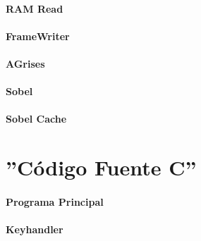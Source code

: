 \documentclass[a4paper,12pt,titlepage,final]{book}
\begin{document}
\subsubsection{RAM Read}
\raggedbottom

\flushbottom
\clearpage

\subsubsection{FrameWriter}
\raggedbottom

\flushbottom
\clearpage

\subsubsection{AGrises}
\raggedbottom

\flushbottom
\clearpage

\subsubsection{Sobel}
\raggedbottom

\flushbottom
\clearpage

\subsubsection{Sobel Cache}
\raggedbottom

\flushbottom
\clearpage

\chapter{''Código Fuente C''}
\lstset{
language=c
}

\subsubsection{Programa Principal}
\raggedbottom

\flushbottom
\clearpage

\subsubsection{Keyhandler}
\raggedbottom

\flushbottom
\clearpage
\end{document}

